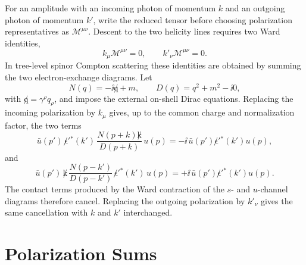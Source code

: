 \begin{remark}
For an amplitude with an incoming photon of momentum \(k\) and an outgoing
photon of momentum \(k'\), write the reduced tensor before choosing
polarization representatives as \(\mathcal M^{\mu\nu}\).  Descent to the two
helicity lines requires two Ward identities,
\[
  k_\mu\mathcal M^{\mu\nu}=0,
  \qquad
  k'_\nu\mathcal M^{\mu\nu}=0 .
\]
In tree-level spinor Compton scattering these identities are obtained by
summing the two electron-exchange diagrams.  Let
\[
  N(q)=-\ii\not q+m,\qquad D(q)=q^2+m^2-\ii0 ,
\]
with \(\not q=\gamma^\rho q_\rho\),
and impose the external on-shell Dirac equations.  Replacing the incoming
polarization by \(k_\mu\) gives, up to the common charge and normalization
factor, the two terms
\[
  \bar u(p')\,\not\epsilon'{}^*(k')\,\frac{N(p+k)\not k}{D(p+k)}\,u(p)
  =
  -\ii\,\bar u(p')\not\epsilon'{}^*(k')u(p),
\]
and
\[
  \bar u(p')\,\not k\,\frac{N(p-k')}{D(p-k')}\,
  \not\epsilon'{}^*(k')\,u(p)
  =
  +\ii\,\bar u(p')\not\epsilon'{}^*(k')u(p).
\]
The contact terms produced by the Ward contraction of the \(s\)- and
\(u\)-channel diagrams therefore cancel.  Replacing the outgoing polarization
by \(k'_\nu\) gives the same cancellation with \(k\) and \(k'\) interchanged.
\end{remark}

\begin{center}
\end{center}

\section{Polarization Sums}

